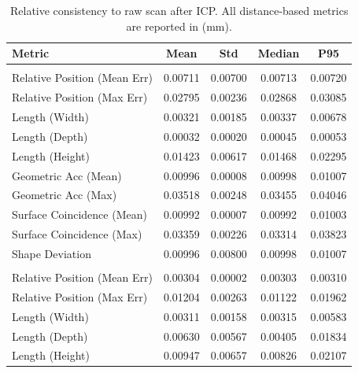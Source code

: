 \documentclass{ieeeaccess}
\begin{document}
\begin{table}[t]
  \centering
  \footnotesize
  \setlength{\tabcolsep}{3pt}
  \caption{Relative consistency to raw scan after ICP.
  All distance-based metrics are reported in (mm).}
  \label{tab:consistency_all}
  \begin{tabular}{
      >{\raggedright\arraybackslash}p{}
      S S S S
  }
    \toprule
    \textbf{Metric} & \textbf{Mean} & \textbf{Std} & \textbf{Median} & \textbf{P95} \\
    \midrule
     \\
    Relative Position (Mean Err)   & 0.00711 & 0.00700 & 0.00713 & 0.00720 \\
    Relative Position (Max Err)    & 0.02795 & 0.00236 & 0.02868 & 0.03085 \\
    Length (Width)                 & 0.00321 & 0.00185 & 0.00337 & 0.00678 \\
    Length (Depth)                 & 0.00032 & 0.00020 & 0.00045 & 0.00053 \\
    Length (Height)                & 0.01423 & 0.00617 & 0.01468 & 0.02295 \\
    Geometric Acc (Mean)           & 0.00996 & 0.00008 & 0.00998 & 0.01007 \\
    Geometric Acc (Max)            & 0.03518 & 0.00248 & 0.03455 & 0.04046 \\
    Surface Coincidence (Mean)     & 0.00992 & 0.00007 & 0.00992 & 0.01003 \\
    Surface Coincidence (Max)      & 0.03359 & 0.00226 & 0.03314 & 0.03823 \\
    Shape Deviation                & 0.00996 & 0.00800 & 0.00998 & 0.01007 \\
    \midrule
     \\
    Relative Position (Mean Err)      & 0.00304 & 0.00002 & 0.00303 & 0.00310 \\
    Relative Position (Max Err)       & 0.01204 & 0.00263 & 0.01122 & 0.01962 \\
    Length (Width)                    & 0.00311 & 0.00158 & 0.00315 & 0.00583 \\
    Length (Depth)                    & 0.00630 & 0.00567 & 0.00405 & 0.01834 \\
    Length (Height)                   & 0.00947 & 0.00657 & 0.00826 & 0.02107 \\

\end{tabular}
\end{table}
\end{document}
